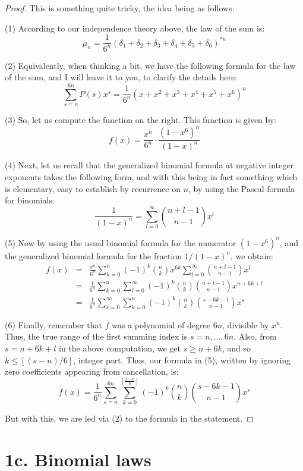 \documentclass[12pt]{amsbook}
\begin{document}
\begin{proof}
This is something quite tricky, the idea being as follows:

\medskip

(1) According to our independence theory above, the law of the sum is:
$$\mu_n=\frac{1}{6^n}(\delta_1+\delta_2+\delta_3+\delta_4+\delta_5+\delta_6)^{*n}$$

(2) Equivalently, when thinking a bit, we have the following formula for the law of the sum, and I will leave it to you, to clarify the details here:
$$\sum_{s=n}^{6n}P(s)x^s=\frac{1}{6^n}(x+x^2+x^3+x^4+x^5+x^6)^n$$

(3) So, let us compute the function on the right. This function is given by:
$$f(x)
=\frac{x^n}{6^n}\cdot\frac{(1-x^6)^n}{(1-x)^n}$$

(4) Next, let us recall that the generalized binomial formula at negative integer exponents takes the following form, and with this being in fact something which is elementary, easy to establish by recurrence on $n$, by using the Pascal formula for binomials:
$$\frac{1}{(1-x)^n}=\sum_{l=0}^\infty\binom{n+l-1}{n-1}x^l$$

(5) Now by using the usual binomial formula for the numerator $(1-x^6)^n$, and the generalized  binomial formula for the fraction $1/(1-x)^n$, we obtain:
\begin{eqnarray*}
f(x)
&=&\frac{x^n}{6^n}\sum_{k=0}^n(-1)^k\binom{n}{k}x^{6k}\sum_{l=0}^\infty\binom{n+l-1}{n-1}x^l\\
&=&\frac{1}{6^n}\sum_{k=0}^n\sum_{l=0}^\infty(-1)^k\binom{n}{k}\binom{n+l-1}{n-1}x^{n+6k+l}\\
&=&\frac{1}{6^n}\sum_{s=0}^\infty\sum_{k=0}^n(-1)^k\binom{n}{k}\binom{s-6k-1}{n-1}x^s
\end{eqnarray*}

(6) Finally, remember that $f$ was a polynomial of degree $6n$, divisible by $x^n$. Thus, the true range of the first summing index is $s=n,\ldots,6n$. Also, from $s=n+6k+l$ in the above computation, we get $s\geq n+6k$, and so $k\leq[(s-n)/6]$, integer part. Thus, our formula in (5), written by ignoring zero coefficients appearing from cancellation, is:
$$f(x)=\frac{1}{6^n}\sum_{s=n}^{6n}\sum_{k=0}^{[\frac{s-n}{6}]}(-1)^k\binom{n}{k}\binom{s-6k-1}{n-1}x^s$$

But with this, we are led via (2) to the formula in the statement.
\end{proof}

\section*{1c. Binomial laws}
\end{document}
